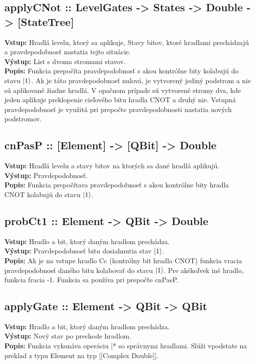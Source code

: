 \subsection*{applyCNot ::  LevelGates -> States -> Double -> [StateTree]}
\textbf{Vstup:} Hradlá levelu, ktorý sa aplikuje, Stavy bitov, ktoré hradlami
prechádzajú a pravdepodobnosť nastatia tejto situácie.\\
\textbf{Výstup:} List s dvoma stromami stavov.\\
\textbf{Popis:} Funkcia prepočíta pravdepodobnosť s akou kontrólne bity 
kolabujú do stavu \(\ket{1}\). Ak je táto pravdepodobnosť nulová, je 
vytvorený jediný podstrom a nie sú aplikované žiadne hradlá. V opačnom prípade
sú vytvorené stromy dva, kde jeden aplikuje preklopenie cieľového bitu hradla
CNOT a druhý nie. Vstupná pravdepodobnosť je využitá pri prepočte 
pravdepodobnosti nastatia nových podstromov.

\subsection*{cnPasP :: [Element] -> [QBit] -> Double}
\textbf{Vstup:} Hradlá levelu a stavy bitov na ktorých sa dané hradlá 
aplikujú.\\
\textbf{Výstup:} Pravdepodobnosť.\\
\textbf{Popis:} Funkcia prepočítava pravdepodobnosť s akou kontrólne bity 
hradla CNOT kolabujú do stavu \(\ket{1}\).

\subsection*{probCt1 :: Element -> QBit -> Double}
\textbf{Vstup:} Hradlo a bit, ktorý daným hradlom prechádza.\\
\textbf{Výstup:} Pravdepodobnosť bitu dosiahnutia stav \(\ket{1}\).\\
\textbf{Popis:} Ak je na vstupe hradlo Cc (kontrólny bit hradla CNOT) funkcia
vracia pravdepodobnosť daného bitu kolabovať do stavu \(\ket{1}\). Pre 
akékoľvek iné hradlo, funkcia fracia -1. Funkcia sa používa pri prepočťe 
cnPasP.

\subsection*{applyGate :: Element -> QBit -> QBit}
\textbf{Vstup:} Hradlo a bit, ktorý daným hradlom prechádza.\\
\textbf{Výstup:} Nový stav po prechode hradlom.\\
\textbf{Popis:} Funkcia vykonáva operáciu |* so správnymi hradlami. Slúži
vpodstate na preklad z typu Element na typ [[Complex Double]].

